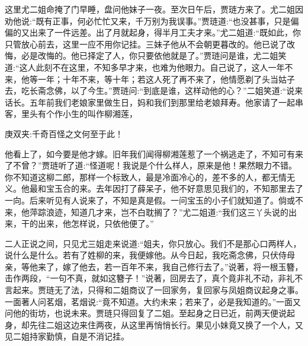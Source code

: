 \begin{parag}
    这里尤二姐命掩了门早睡，盘问他妹子一夜。至次日午后，贾琏方来了。尤二姐因劝他说:“既有正事，何必忙忙又来，千万别为我误事。”贾琏道:“也没甚事，只是偏偏的又出来了一件远差。出了月就起身，得半月工夫才来。”尤二姐道:“既如此，你只管放心前去，这里一应不用你记挂。三妹子他从不会朝更暮改的。他已说了改悔，必是改悔的。他已择定了人，你只要依他就是了。”贾琏问是谁，尤二姐笑道:“这人此刻不在这里，不知多早才来，也难为他眼力。自己说了，这人一年不来，他等一年；十年不来，等十年；若这人死了再不来了，他情愿剃了头当姑子去，吃长斋念佛，以了今生。”贾琏问:“到底是谁，这样动他的心？”二姐笑道:“说来话长。五年前我们老娘家里做生日，妈和我们到那里给老娘拜寿。他家请了一起串客，里头有个作小生的叫作柳湘莲，\begin{note}庚双夹:千奇百怪之文何至于此！\end{note}他看上了，如今要是他才嫁。旧年我们闻得柳湘莲惹了一个祸逃走了，不知可有来了不曾？”贾琏听了道:“怪道呢！我说是个什么样人，原来是他！果然眼力不错。你不知道这柳二郎，那样一个标致人，最是冷面冷心的，差不多的人，都无情无义。他最和宝玉合的来。去年因打了薛呆子，他不好意思见我们的，不知那里去了一向。后来听见有人说来了，不知是真是假。一问宝玉的小子们就知道了。倘或不来，他萍踪浪迹，知道几才来，岂不白耽搁了？”尤二姐道:“我们这三丫头说的出来，干的出来，他怎样说，只依他便了。”
\end{parag}


\begin{parag}
    二人正说之间，只见尤三姐走来说道:“姐夫，你只放心。我们不是那心口两样人，说什么是什么。若有了姓柳的来，我便嫁他。从今日起，我吃斋念佛，只伏侍母亲，等他来了，嫁了他去，若一百年不来，我自己修行去了。”说著，将一根玉簪，击作两段，“一句不真，就如这簪子！”说著，回房去了，真个竟非礼不动，非礼不言起来。贾琏无了法，只得和二姐商议了一回家务，复回家与凤姐商议起身之事。一面著人问茗烟，茗烟说:“竟不知道。大约未来；若来了，必是我知道的。”一面又问他的街坊，也说未来。贾琏只得回复了二姐。至起身之日已近，前两天便说起身，却先往二姐这边来住两夜，从这里再悄悄长行。果见小妹竟又换了一个人，又见二姐持家勤慎，自是不消记挂。
\end{parag}


